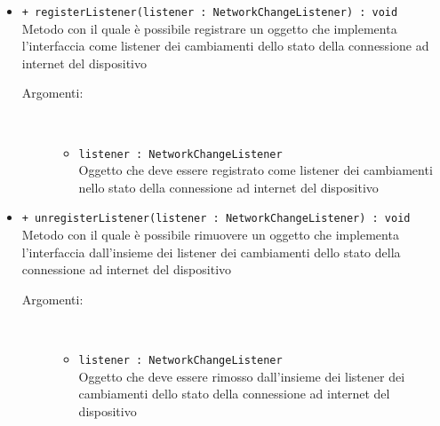\documentclass[../Tesi.tex]{subfiles}
\begin{document}
\begin{description}
\begin{itemize}
				\item \texttt{+ registerListener(listener : NetworkChangeListener) : void}\\
				Metodo con il quale è possibile registrare un oggetto che implementa l'interfaccia  come listener dei cambiamenti dello stato della connessione ad internet del dispositivo
				\begin{description}
					\item[Argomenti:] \
					\begin{itemize}
						\item \texttt{listener : NetworkChangeListener}\\
						Oggetto che deve essere registrato come listener dei cambiamenti nello stato della connessione ad internet del dispositivo
					\end{itemize}
				\end{description}

				\item \texttt{+ unregisterListener(listener : NetworkChangeListener) : void}\\
				Metodo con il quale è possibile rimuovere un oggetto che implementa l'interfaccia  dall'insieme dei listener dei cambiamenti dello stato della connessione ad internet del dispositivo
				\begin{description}
					\item[Argomenti:] \
					\begin{itemize}
						\item \texttt{listener : NetworkChangeListener}\\
						Oggetto che deve essere rimosso dall'insieme dei listener dei cambiamenti dello stato della connessione ad internet del dispositivo
					\end{itemize}
				\end{description}
			\end{itemize}
		\end{description}
\end{document}
